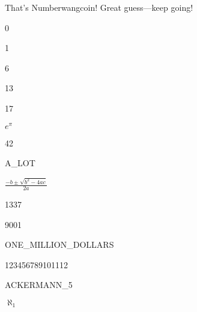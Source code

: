 That's Numberwangcoin! Great guess---keep going!

\begin{switch}
\item{0}
\item{1}
\item{6}
\item{13}
\item{17}
\item{$e^\pi$}
\item{42}
\item{A\_LOT}
\item{$\frac{-b \pm \sqrt{b^2 - 4ac}}{2a}$}
\item{1337}
\item{9001}
\item{ONE\_MILLION\_DOLLARS}
\item{123456789101112}
\item{ACKERMANN\_5}
\item{$\aleph_1$}
\end{switch}


